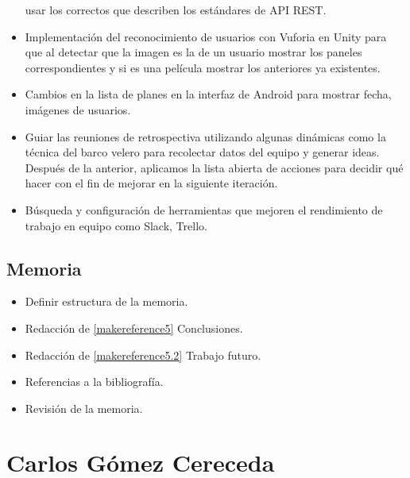 \begin{itemize}
            usar los correctos que describen los estándares de API REST.
            \item Implementación del reconocimiento de usuarios con Vuforia en Unity
             para que al detectar que la imagen es la de un usuario mostrar los
             paneles correspondientes y si es una película mostrar los anteriores
             ya existentes.
            \item Cambios en la lista de planes en la interfaz de Android para
             mostrar fecha, imágenes de usuarios.
            \item Guiar las reuniones de retrospectiva utilizando algunas dinámicas
             como la técnica del barco velero para recolectar datos del equipo y
             generar ideas. Después de la anterior, aplicamos la lista abierta de
             acciones para decidir qué hacer con el fin de mejorar en la
             siguiente iteración.
            \item Búsqueda y configuración de herramientas que mejoren el
             rendimiento de trabajo en equipo como Slack, Trello.
        \end{itemize}
    \subsection{Memoria}
    \label{makereference7.2.3}
        \begin{itemize}
            \item Definir estructura de la memoria.
            \item Redacción de \autoref{makereference5} Conclusiones.
            \item Redacción de \autoref{makereference5.2} Trabajo futuro.
            \item Referencias a la bibliografía.
            \item Revisión de la memoria.
        \end{itemize}

        \section{Carlos Gómez Cereceda}
        \label{makereference7.3}
